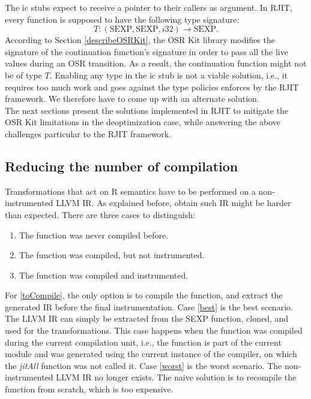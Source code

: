 The ic stubs expect to receive a pointer to their callers as argument.
In RJIT, every function is supposed to have the following type signature:
$$T: (\text{SEXP}, \text{SEXP}, i32) \rightarrow \text{SEXP}.$$
According to Section \ref{describeOSRKit}, the OSR Kit\cite{OSRKit} library modifies the signature of the continuation function's signature in order to pass all the live values during an OSR transition.
As a result, the continuation function might not be of type $T$.
Enabling any type in the ic stub is not a viable solution, i.e., it requires too much work and goes against the type policies enforces by the RJIT framework. 
We therefore have to come up with an alternate solution.\\

The next sections present the solutions implemented in RJIT to mitigate the OSR Kit limitations in the deoptimization case, while answering the above challenges particular to the RJIT framework.\\

\subsection{Reducing the number of compilation}

Transformations that act on R semantics have to be performed on a non-instrumented LLVM IR.
As explained before, obtain such IR might be harder than expected. 
There are three cases to distinguish:
\begin{enumerate}
    \item The function was never compiled before.\label{toCompile}
    \item The function was compiled, but not instrumented.\label{best} 
    \item The function was compiled and instrumented.\label{worst}
\end{enumerate}

For \ref{toCompile}, the only option is to compile the function, and extract the generated IR before the final instrumentation.
Case \ref{best} is the best scenario.
The LLVM IR can simply be extracted from the SEXP function, cloned, and used for the transformations.
This case happens when the function was compiled during the current compilation unit, i.e., the function is part of the current module and was generated using the current instance of the compiler, on which the \textit{jitAll} function was not called it.
Case \ref{worst} is the worst scenario.
The non-instrumented LLVM IR no longer exists.
The naive solution is to recompile the function from scratch, which is too expensive.\\

